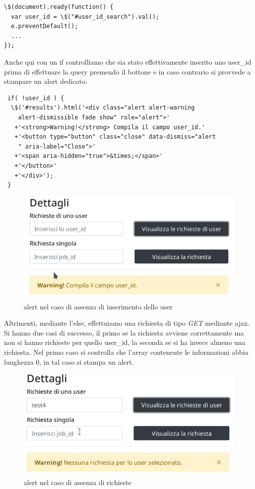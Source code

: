 \documentclass[a4paper,12pt, oneside]{book}
\begin{document}
\begin{shaded}
\begin{verbatim}
\$(document).ready(function() {
  var user_id = \$("#user_id_search").val();
  e.preventDefault();
  ...
});
\end{verbatim}
\end{shaded}
Anche qui con un if controlliamo che sia stato effettivamente inserito uno user\_id prima di effettuare la query premendo il bottone e in caso contrario si provvede a stampare un alert dedicato:

\begin{shaded}
\begin{verbatim}
 if( !user_id ) {
  \$('#results').html('<div class="alert alert-warning
    alert-dismissible fade show" role="alert">'
   +'<strong>Warning!</strong> Compila il campo user_id.'
   +'<button type="button" class="close" data-dismiss="alert
    " aria-label="Close">'
   +'<span aria-hidden="true">&times;</span>'
   +'</button>'
   +'</div>');
 }
\end{verbatim}
\end{shaded}
\begin{figure}[H]
  \centering
  \includegraphics[scale = 0.7]{img/bad-user.png}
  \caption{alert nel caso di assenza di inserimento dello user}
\end{figure}
Altrimenti, mediante l'else, effettuiamo una richiesta di tipo \textit{GET} mediante ajax.
Si hanno due casi di successo, il primo se la richiesta avviene correttamente ma non
si hanno richieste per quello user\_id, la seconda se si ha invece almeno una richiesta.
Nel primo caso si controlla che l'array contenente le informazioni abbia lunghezza 0,
in tal caso si stampa un alert.
\begin{figure}[H]
  \centering
  \includegraphics[scale = 0.7]{img/no-user.png}
  \caption{alert nel caso di assenza di richieste}
\end{figure}
\end{document}
